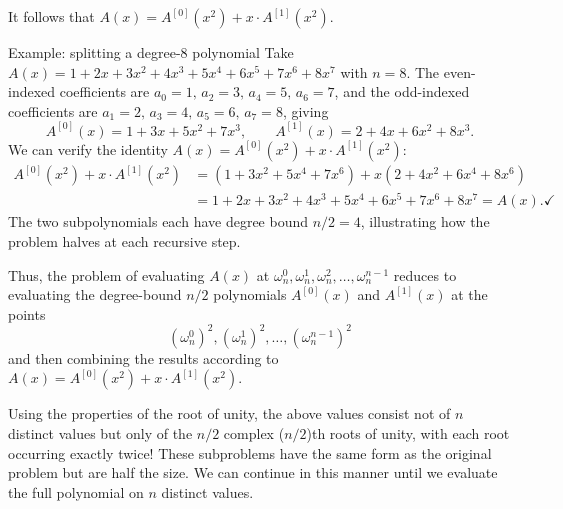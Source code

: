 It follows that $A(x)=A^{[0]}(x^2) + x\cdot A^{[1]}(x^2)$.
\begin{examplebox}{Example: splitting a degree-8 polynomial}
Take $A(x) = 1 + 2x + 3x^2 + 4x^3 + 5x^4 + 6x^5 + 7x^6 + 8x^7$ with $n = 8$.
The even-indexed coefficients are $a_0=1,\, a_2=3,\, a_4=5,\, a_6=7$, and the odd-indexed coefficients are $a_1=2,\, a_3=4,\, a_5=6,\, a_7=8$, giving
$$A^{[0]}(x) = 1 + 3x + 5x^2 + 7x^3, \qquad A^{[1]}(x) = 2 + 4x + 6x^2 + 8x^3.$$
We can verify the identity $A(x) = A^{[0]}(x^2) + x \cdot A^{[1]}(x^2)$:
\begin{align*}
  A^{[0]}(x^2) + x \cdot A^{[1]}(x^2)
  &= (1 + 3x^2 + 5x^4 + 7x^6) + x(2 + 4x^2 + 6x^4 + 8x^6)\\
  &= 1 + 2x + 3x^2 + 4x^3 + 5x^4 + 6x^5 + 7x^6 + 8x^7 = A(x). \checkmark
\end{align*}
The two subpolynomials each have degree bound $n/2 = 4$, illustrating how the problem halves at each recursive step.
\end{examplebox}

Thus, the problem of evaluating $A(x)$ at 
$\omega_n^0, \omega_n^1, \omega_n^2,\dots, \omega_n^{n-1}$ 
reduces to evaluating the degree-bound $n/2$ polynomials  $A^{[0]}(x)$ and $A^{[1]}(x)$ at the points
$$(\omega_n^0)^2, (\omega_n^1)^2,\dots, (\omega_n^{n-1})^2$$
and then combining the results according to $A(x)=A^{[0]}(x^2) + x\cdot A^{[1]}(x^2)$.


Using the properties of the root of unity, 
the above values consist not of $n$ distinct values but only of the $n/2$
 complex ($n/2$)th roots of unity, with each root occurring exactly twice!
These subproblems have the same form as the original problem but are half the size.
We can continue in this manner until we evaluate the full polynomial on $n$ distinct values.

